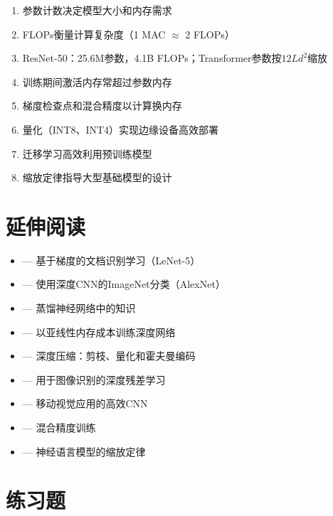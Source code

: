 \begin{enumerate}
    \item 参数计数决定模型大小和内存需求
    \item FLOPs衡量计算复杂度（1 MAC $\approx$ 2 FLOPs）
    \item ResNet-50：25.6M参数，4.1B FLOPs；Transformer参数按$12Ld^2$缩放
    \item 训练期间激活内存常超过参数内存
    \item 梯度检查点和混合精度以计算换内存
    \item 量化（INT8、INT4）实现边缘设备高效部署
    \item 迁移学习高效利用预训练模型
    \item 缩放定律指导大型基础模型的设计
\end{enumerate}

\section{延伸阅读}

\begin{itemize}
    \item \cite{lecun1998gradient} --- 基于梯度的文档识别学习（LeNet-5）
    \item \cite{krizhevsky2012imagenet} --- 使用深度CNN的ImageNet分类（AlexNet）
    \item \cite{hinton2015distilling} --- 蒸馏神经网络中的知识
    \item \cite{chen2016training} --- 以亚线性内存成本训练深度网络
    \item \cite{han2015deep} --- 深度压缩：剪枝、量化和霍夫曼编码
    \item \cite{he2016deep} --- 用于图像识别的深度残差学习
    \item \cite{howard2017mobilenets} --- 移动视觉应用的高效CNN
    \item \cite{micikevicius2018mixed} --- 混合精度训练
    \item \cite{kaplan2020scaling} --- 神经语言模型的缩放定律
\end{itemize}

\section{练习题}

